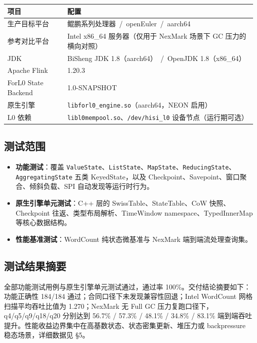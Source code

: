 \documentclass[a4paper,11pt]{article}
\newcommand{\project}{ForL0 State Backend}
\begin{document}
\begin{table}[H]
\centering
\small
\begin{tabularx}{\textwidth}{L{3.2cm} X}
\toprule
\textbf{项目} & \textbf{配置} \\
\midrule
生产目标平台 & 鲲鹏系列处理器 \,/\, openEuler \,/\, aarch64 \\
参考对比平台 & Intel x86\_64 服务器（仅用于 NexMark 场景下 GC 压力的横向对照） \\
JDK & BiSheng JDK 1.8（aarch64） \,/\, OpenJDK 1.8（x86\_64） \\
Apache Flink & 1.20.3 \\
\project{} & 1.0-SNAPSHOT \\
原生引擎 & \texttt{libforl0\_engine.so}（aarch64，NEON 启用） \\
L0 依赖 & \texttt{libl0mempool.so}、\texttt{/dev/hisi\_l0} 设备节点（运行期可选） \\
\bottomrule
\end{tabularx}
\end{table}

\subsection{测试范围}

\begin{itemize}
  \item \textbf{功能测试}：覆盖 \texttt{ValueState}、\texttt{ListState}、\texttt{MapState}、\texttt{ReducingState}、\texttt{AggregatingState} 五类 KeyedState，以及 Checkpoint、Savepoint、窗口聚合、倾斜负载、SPI 自动发现等运行时行为。
  \item \textbf{原生引擎单元测试}：C++ 层的 SwissTable、StateTable、CoW 快照、Checkpoint 往返、类型布局解析、TimeWindow namespace、TypedInnerMap 等核心数据结构。
  \item \textbf{性能基准测试}：WordCount 纯状态微基准与 NexMark 端到端流处理查询集。
\end{itemize}

\subsection{测试结果摘要}

全部功能测试用例与原生引擎单元测试通过，通过率 100\%。交付结论摘要如下：功能正确性 184/184 通过；合同口径下未发现兼容性回退；Intel WordCount 网格扫描平均吞吐比值为 1.270；NexMark 无 Full GC 压力复跑口径下，q4/q5/q9/q18/q20 分别达到 56.7\% / 57.3\% / 48.1\% / 34.8\% / 83.1\% 端到端吞吐提升。性能收益边界集中在高基数状态、状态密集更新、堆压力或 backpressure 稳态场景，详细数据见 \S5。
\end{document}
